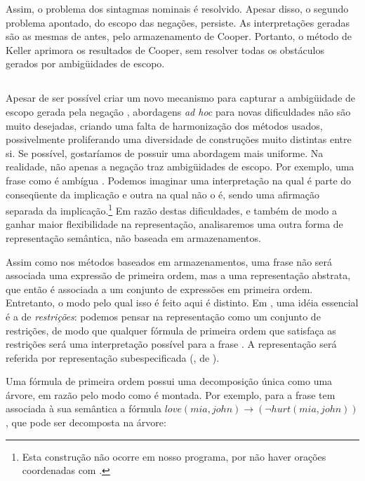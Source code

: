 Assim, o problema dos sintagmas nominais é resolvido. Apesar disso, o segundo problema apontado, do escopo das negações, persiste. As interpretações geradas são as mesmas de antes, pelo armazenamento de Cooper.  Portanto, o método de Keller aprimora os resultados de Cooper, sem resolver todas os obstáculos gerados por ambigüidades de escopo.

\subsection{}

Apesar de ser possível criar um novo mecanismo para capturar a ambigüidade de escopo gerada pela negação , abordagens \textit{ad hoc} para novas dificuldades não são muito desejadas, criando uma falta de harmonização dos métodos usados, possivelmente proliferando uma diversidade de construções muito distintas entre si. Se possível, gostaríamos de possuir uma abordagem mais uniforme. Na realidade, não apenas a negação traz ambigüidades de escopo. Por exemplo, uma frase como  é ambígua \cite{HoleSem}. Podemos imaginar uma interpretação na qual  é parte do conseqüente da implicação e outra na qual não o é, sendo uma afirmação separada da implicação.\footnote{Esta construção não ocorre em nosso programa, por não haver orações coordenadas com .} Em razão destas dificuldades, e também de modo a ganhar maior flexibilidade na representação, analisaremos uma outra forma de representação semântica, não baseada em armazenamentos. 

Assim como nos métodos baseados em armazenamentos, uma frase não será associada uma expressão de primeira ordem, mas a uma representação abstrata, que então é associada a um conjunto de expressões em primeira ordem. Entretanto, o modo pelo qual isso é feito aqui é distinto. Em , uma idéia essencial é a de \textit{restrições}: podemos pensar na representação como um conjunto de restrições, de modo que qualquer fórmula de primeira ordem que satisfaça as restrições será uma interpretação possível para a frase \cite[p.~129]{BlackburnBos:2005}. A representação será referida por representação subespecificada (, de ).

Uma fórmula de primeira ordem possui uma decomposição única como uma árvore, em razão pelo modo como é montada. Por exemplo, para a frase  tem associada à sua semântica a fórmula $love(mia,john) \rightarrow (\neg hurt(mia,john))$, que pode ser decomposta na árvore:


